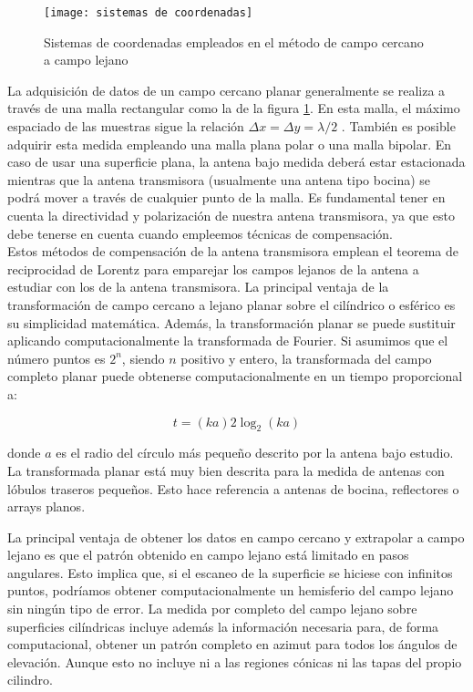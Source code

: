 \begin{figure}[h] 
  \centering
    \texttt{[image: sistemas de coordenadas]}
    \caption{Sistemas de coordenadas empleados en el método de campo cercano a campo lejano}
    \label{Sistemas de coordenadas empleados en el método de campo cercano a campo lejano}
\end{figure}

La adquisición de datos de un campo cercano planar generalmente se realiza a través de una malla rectangular como la de la figura \ref{Sistemas de coordenadas empleados en el método de campo cercano a campo lejano}. En esta malla, el máximo espaciado de las muestras sigue la relación $\Delta x = \Delta y = \lambda/2$ . También es posible adquirir esta medida empleando una malla plana polar o una malla bipolar. En caso de usar una superficie plana, la antena bajo medida deberá estar estacionada mientras que la antena transmisora (usualmente una antena tipo bocina) se podrá mover a través de cualquier punto de la malla. Es fundamental tener en cuenta la directividad y polarización de nuestra antena transmisora, ya que esto debe tenerse en cuenta cuando empleemos técnicas de compensación.\\ 

Estos métodos de compensación de la antena transmisora emplean el teorema de reciprocidad de Lorentz para emparejar los campos lejanos de la antena a estudiar con los de la antena transmisora. La principal ventaja de la transformación de campo cercano a lejano planar sobre el cilíndrico o esférico es su simplicidad matemática.  Además, la transformación planar se puede sustituir aplicando computacionalmente la transformada de Fourier. Si asumimos que el número puntos es $2^n$, siendo $n$ positivo y entero, la transformada del campo completo planar puede obtenerse computacionalmente en un tiempo proporcional a: 

\begin{equation}
    t = (ka)2\log_2(ka)
    \label{proporcion temporal cálculo de fourier}
\end{equation}

\noindent
donde $a$ es el radio del círculo más pequeño descrito por la antena bajo estudio. La transformada planar está muy bien descrita para la medida de antenas con lóbulos traseros pequeños. Esto hace referencia a antenas de bocina, reflectores o arrays planos. 

\newpage

La principal ventaja de obtener los datos en campo cercano y extrapolar a campo lejano es que el patrón obtenido en campo lejano está limitado en pasos angulares. Esto implica que, si el escaneo de la superficie se hiciese con infinitos puntos, podríamos obtener computacionalmente un hemisferio del campo lejano sin ningún tipo de error. La medida por completo del campo lejano sobre superficies cilíndricas incluye además la información necesaria para, de forma computacional, obtener un patrón completo en azimut para todos los ángulos de elevación. Aunque esto no incluye ni a las regiones cónicas ni las tapas del propio cilindro.\\

